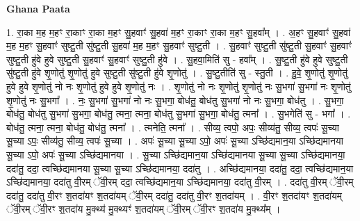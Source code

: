 \documentclass[17pt]{extarticle}
\begin{document}
\textbf{Ghana Paata } \newline

1. रा॒का म॒ह म॒हꣳ रा॒काꣳ रा॒का म॒हꣳ सु॒हवाꣳ॑ सु॒हवा॑ म॒हꣳ रा॒काꣳ रा॒का म॒हꣳ सु॒हवा᳚म् । . अ॒हꣳ सु॒हवाꣳ॑ सु॒हवा॑ म॒ह म॒हꣳ सु॒हवाꣳ॑ सुष्टु॒ती सु॑ष्टु॒ती सु॒हवा॑ म॒ह म॒हꣳ सु॒हवाꣳ॑ सुष्टु॒ती । . सु॒हवाꣳ॑ सुष्टु॒ती सु॑ष्टु॒ती सु॒हवाꣳ॑ सु॒हवाꣳ॑ सुष्टु॒ती हु॑वे हुवे सुष्टु॒ती सु॒हवाꣳ॑ सु॒हवाꣳ॑ सुष्टु॒ती हु॑वे । . सु॒हवा॒मिति॑ सु - हवा᳚म् । . सु॒ष्टु॒ती हु॑वे हुवे सुष्टु॒ती सु॑ष्टु॒ती हु॑वे शृ॒णोतु॑ शृ॒णोतु॑ हुवे सुष्टु॒ती सु॑ष्टु॒ती हु॑वे शृ॒णोतु॑ । . सु॒ष्टु॒तीति॑ सु - स्तु॒ती । . हु॒वे॒ शृ॒णोतु॑ शृ॒णोतु॑ हुवे हुवे शृ॒णोतु॑ नो नः शृ॒णोतु॑ हुवे हुवे शृ॒णोतु॑ नः । . शृ॒णोतु॑ नो नः शृ॒णोतु॑ शृ॒णोतु॑ नः सु॒भगा॑ सु॒भगा॑ नः शृ॒णोतु॑ शृ॒णोतु॑ नः सु॒भगा᳚ । . नः॒ सु॒भगा॑ सु॒भगा॑ नो नः सु॒भगा॒ बोध॑तु॒ बोध॑तु सु॒भगा॑ नो नः सु॒भगा॒ बोध॑तु । . सु॒भगा॒ बोध॑तु॒ बोध॑तु सु॒भगा॑ सु॒भगा॒ बोध॑तु॒ त्मना॒ त्मना॒ बोध॑तु सु॒भगा॑ सु॒भगा॒ बोध॑तु॒ त्मना᳚ । . सु॒भगेति॑ सु - भगा᳚ । . बोध॑तु॒ त्मना॒ त्मना॒ बोध॑तु॒ बोध॑तु॒ त्मना᳚ । . त्मनेति॒ त्मना᳚ । . सीव्य॒ त्वपो॒ अपः॒ सीव्य॑तु॒ सीव्य॒ त्वपः॑ सू॒च्या सू॒च्या ऽपः॒ सीव्य॑तु॒ सीव्य॒ त्वपः॑ सू॒च्या । . अपः॑ सू॒च्या सू॒च्या ऽपो॒ अपः॑ सू॒च्या ऽच्छि॑द्यमान॒या ऽच्छि॑द्यमानया सू॒च्या ऽपो॒ अपः॑ सू॒च्या ऽच्छि॑द्यमानया । . सू॒च्या ऽच्छि॑द्यमान॒या ऽच्छि॑द्यमानया सू॒च्या सू॒च्या ऽच्छि॑द्यमानया॒ ददा॑तु॒ ददा॒ त्वच्छि॑द्यमानया सू॒च्या सू॒च्या ऽच्छि॑द्यमानया॒ ददा॑तु । . अच्छि॑द्यमानया॒ ददा॑तु॒ ददा॒ त्वच्छि॑द्यमान॒या ऽच्छि॑द्यमानया॒ ददा॑तु वी॒रम् ॅवी॒रम् ददा॒ त्वच्छि॑द्यमान॒या ऽच्छि॑द्यमानया॒ ददा॑तु वी॒रम् । . ददा॑तु वी॒रम् ॅवी॒रम् ददा॑तु॒ ददा॑तु वी॒रꣳ श॒तदा॑यꣳ श॒तदा॑यम् ॅवी॒रम् ददा॑तु॒ ददा॑तु वी॒रꣳ श॒तदा॑यम् । . वी॒रꣳ श॒तदा॑यꣳ श॒तदा॑यम् ॅवी॒रम् ॅवी॒रꣳ श॒तदा॑य मु॒क्थ्य॑ मु॒क्थ्यꣳ॑ श॒तदा॑यम् ॅवी॒रम् ॅवी॒रꣳ श॒तदा॑य मु॒क्थ्य᳚म् । \newline
\end{document}
